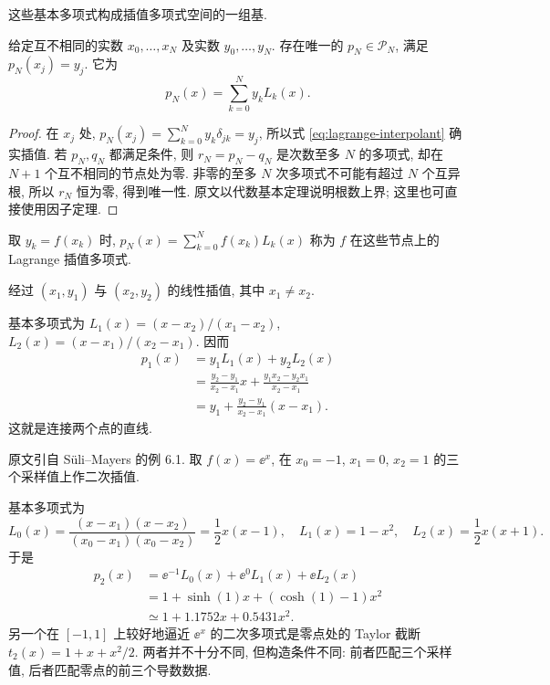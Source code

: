 这些基本多项式构成插值多项式空间的一组基.

\begin{theorem}\label{thm:lagrange-interpolation}
给定互不相同的实数 $x_0,\ldots,x_N$ 及实数 $y_0,\ldots,y_N$. 存在唯一的 $p_N\in\mathcal P_N$, 满足 $p_N(x_j)=y_j$. 它为
\begin{equation}\label{eq:lagrange-interpolant}
p_N(x)=\sum_{k=0}^{N}y_kL_k(x).
\end{equation}
\end{theorem}
\begin{proof}
在 $x_j$ 处, $p_N(x_j)=\sum_{k=0}^{N}y_k\delta_{jk}=y_j$, 所以式 \eqref{eq:lagrange-interpolant} 确实插值. 若 $p_N,q_N$ 都满足条件, 则 $r_N=p_N-q_N$ 是次数至多 $N$ 的多项式, 却在 $N+1$ 个互不相同的节点处为零. 非零的至多 $N$ 次多项式不可能有超过 $N$ 个互异根, 所以 $r_N$ 恒为零, 得到唯一性. 原文以代数基本定理说明根数上界; 这里也可直接使用因子定理.
\end{proof}

取 $y_k=f(x_k)$ 时, $p_N(x)=\sum_{k=0}^{N}f(x_k)L_k(x)$ 称为 $f$ 在这些节点上的 Lagrange 插值多项式.

\begin{example}\label{ex:linear-interpolation}
经过 $(x_1,y_1)$ 与 $(x_2,y_2)$ 的线性插值, 其中 $x_1\neq x_2$.
\end{example}
\begin{solution}
基本多项式为 $L_1(x)=(x-x_2)/(x_1-x_2)$, $L_2(x)=(x-x_1)/(x_2-x_1)$. 因而
\begin{align*}
p_1(x)&=y_1L_1(x)+y_2L_2(x)\\
&=\frac{y_2-y_1}{x_2-x_1}x+\frac{y_1x_2-y_2x_1}{x_2-x_1}\\
&=y_1+\frac{y_2-y_1}{x_2-x_1}(x-x_1).
\end{align*}
这就是连接两个点的直线.
\end{solution}

\begin{example}\label{ex:exp-interpolation}
原文引自 Süli--Mayers 的例 6.1. 取 $f(x)=\ee^x$, 在 $x_0=-1$, $x_1=0$, $x_2=1$ 的三个采样值上作二次插值.
\end{example}
\begin{solution}
基本多项式为
\[
L_0(x)=\frac{(x-x_1)(x-x_2)}{(x_0-x_1)(x_0-x_2)}=\frac12x(x-1),\quad
L_1(x)=1-x^2,\quad L_2(x)=\frac12x(x+1).
\]
于是
\begin{align*}
p_2(x)&=\ee^{-1}L_0(x)+\ee^0L_1(x)+\ee L_2(x)\\
&=1+\sinh(1)x+(\cosh(1)-1)x^2\\
&\simeq1+1.1752x+0.5431x^2.
\end{align*}
另一个在 $[-1,1]$ 上较好地逼近 $\ee^x$ 的二次多项式是零点处的 Taylor 截断 $t_2(x)=1+x+x^2/2$. 两者并不十分不同, 但构造条件不同: 前者匹配三个采样值, 后者匹配零点的前三个导数数据.
\end{solution}

